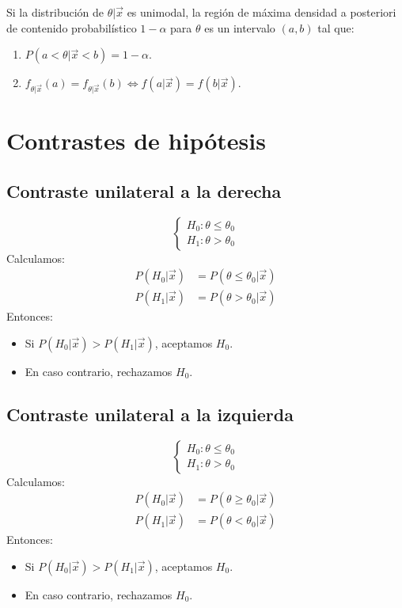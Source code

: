 \begin{note}
    Si la distribución de $\theta|\vec{x}$ es unimodal, la región de máxima densidad a posteriori de contenido probabilístico $1-\alpha$ para $\theta$ es un intervalo $(a, b)$ tal que:
    \begin{enumerate}
        \item $P(a < \theta|\vec{x} < b) = 1-\alpha$.
        \item $f_{\theta|\vec{x}}(a) = f_{\theta|\vec{x}}(b) \Leftrightarrow f(a|\vec{x}) = f(b|\vec{x})$.
    \end{enumerate}
\end{note}

\section{Contrastes de hipótesis}
\subsection*{Contraste unilateral a la derecha}
$$\begin{cases}
        H_0: \theta \leq \theta_0 \\
        H_1: \theta > \theta_0
    \end{cases}$$
Calculamos:
\begin{align*}
    P(H_0|\vec{x}) & = P(\theta \leq \theta_0|\vec{x}) \\
    P(H_1|\vec{x}) & = P(\theta > \theta_0|\vec{x})
\end{align*}
Entonces:
\begin{itemize}
    \item Si $P(H_0|\vec{x}) > P(H_1|\vec{x})$, aceptamos $H_0$.
    \item En caso contrario, rechazamos $H_0$.
\end{itemize}

\subsection*{Contraste unilateral a la izquierda}
$$\begin{cases}
        H_0: \theta \leq \theta_0 \\
        H_1: \theta > \theta_0
    \end{cases}$$
Calculamos:
\begin{align*}
    P(H_0|\vec{x}) & = P(\theta \geq \theta_0|\vec{x}) \\
    P(H_1|\vec{x}) & = P(\theta < \theta_0|\vec{x})
\end{align*}
Entonces:
\begin{itemize}
    \item Si $P(H_0|\vec{x}) > P(H_1|\vec{x})$, aceptamos $H_0$.
    \item En caso contrario, rechazamos $H_0$.
\end{itemize}

